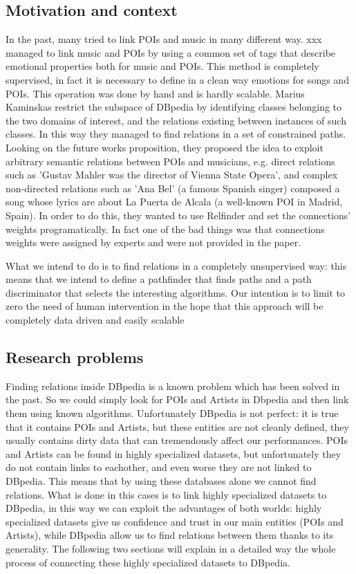 \subsection{Motivation and context}
In the past, many tried to link POIs and music in many different way. xxx managed to link music and POIs by using a common set of tags that describe emotional properties both for music and POIs.
This method is completely supervised, in fact it is necessary to define in a clean way emotions for songs and POIs. This operation was done by hand and is hardly scalable.
Marius Kaminskas restrict the subspace of DBpedia by identifying classes belonging to the two domains of interest, and the relations existing between instances of such classes. In this way they managed to find relations in a set of constrained paths. Looking on the future works proposition, they proposed the idea to exploit arbitrary semantic relations between POIs and musicians, e.g. direct relations such as 'Gustav Mahler was the director of Vienna State Opera', and complex non-directed relations such as 'Ana Bel' (a famous Spanish singer) composed a song whose lyrics are about La Puerta de Alcala (a well-known POI in Madrid, Spain). 
In order to do this, they wanted to use Relfinder and set the connections' weights programatically. In fact one of the bad things was that connections weights were assigned by experts and were not provided in the paper.

What we intend to do is to find relations in a completely unsupervised way: this means that we intend to define a pathfinder that finds paths and a path discriminator that selects the interesting algorithms. Our intention is to limit to zero the need of human intervention in the hope that this approach will be completely data driven and easily scalable 

\subsection{Research problems}
Finding relations inside DBpedia is a known problem which has been solved in the past. So we could simply look for POIs and Artists in Dbpedia and then link them using known algorithms.
Unfortunately DBpedia is not perfect: it is true that it contains POIs and Artists, but these entities are not cleanly defined, they usually contains dirty data that can tremendously affect our performances.
POIs and Artists can be found in highly specialized datasets, but unfortunately they do not contain links to eachother, and even worse they are not linked to DBpedia. This means that by using these databases alone we cannot find relations.
What is done in this cases is to link highly specialized datasets to DBpedia, in this way we can exploit the advantages of both worlds: highly specialized datasets give us confidence and trust in our main entities (POIs and Artists), while DBpedia allow us to find relations between them thanks to its generality.
The following two sections will explain in a detailed way the whole process of connecting these highly specialized datasets to DBpedia.

